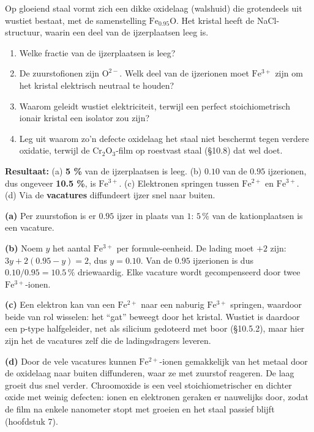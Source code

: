 \begin{oefening}
Op gloeiend staal vormt zich een dikke oxidelaag (walshuid) die grotendeels uit wustiet bestaat, met de samenstelling \(\mathrm{Fe_{0.95}O}\). Het kristal heeft de NaCl-structuur, waarin een deel van de ijzerplaatsen leeg is.

\begin{enumerate}
\item[(a)]
  Welke fractie van de ijzerplaatsen is leeg?
\item[(b)]
  De zuurstofionen zijn \(\mathrm{O^{2-}}\). Welk deel van de ijzerionen moet \(\mathrm{Fe^{3+}}\) zijn om het kristal elektrisch neutraal te houden?
\item[(c)]
  Waarom geleidt wustiet elektriciteit, terwijl een perfect stoichiometrisch ionair kristal een isolator zou zijn?
\item[(d)]
  Leg uit waarom zo'n defecte oxidelaag het staal niet beschermt tegen verdere oxidatie, terwijl de \(\mathrm{Cr_2O_3}\)-film op roestvast staal (§10.8) dat wel doet.
\end{enumerate}
\end{oefening}
\begin{oplossing}
\textbf{Resultaat:} (a) \textbf{5 \%} van de ijzerplaatsen is leeg. (b) \(0.10\) van de \(0.95\) ijzerionen, dus ongeveer \textbf{10.5 \%}, is \(\mathrm{Fe^{3+}}\). (c) Elektronen springen tussen \(\mathrm{Fe^{2+}}\) en \(\mathrm{Fe^{3+}}\). (d) Via de \textbf{vacatures} diffundeert ijzer snel naar buiten.

\textbf{(a)} Per zuurstofion is er \(0.95\) ijzer in plaats van \(1\): \(5\,\%\) van de kationplaatsen is een vacature.

\textbf{(b)} Noem \(y\) het aantal \(\mathrm{Fe^{3+}}\) per formule-eenheid. De lading moet \(+2\) zijn: \(3y + 2(0.95 - y) = 2\), dus \(y = 0.10\). Van de \(0.95\) ijzerionen is dus \(0.10/0.95 = 10.5\,\%\) driewaardig. Elke vacature wordt gecompenseerd door twee \(\mathrm{Fe^{3+}}\)-ionen.

\textbf{(c)} Een elektron kan van een \(\mathrm{Fe^{2+}}\) naar een naburig \(\mathrm{Fe^{3+}}\) springen, waardoor beide van rol wisselen: het ``gat'' beweegt door het kristal. Wustiet is daardoor een p-type halfgeleider, net als silicium gedoteerd met boor (§10.5.2), maar hier zijn het de vacatures zelf die de ladingsdragers leveren.

\textbf{(d)} Door de vele vacatures kunnen \(\mathrm{Fe^{2+}}\)-ionen gemakkelijk van het metaal door de oxidelaag naar buiten diffunderen, waar ze met zuurstof reageren. De laag groeit dus snel verder. Chroomoxide is een veel stoichiometrischer en dichter oxide met weinig defecten: ionen en elektronen geraken er nauwelijks door, zodat de film na enkele nanometer stopt met groeien en het staal passief blijft (hoofdstuk 7).
\end{oplossing}


